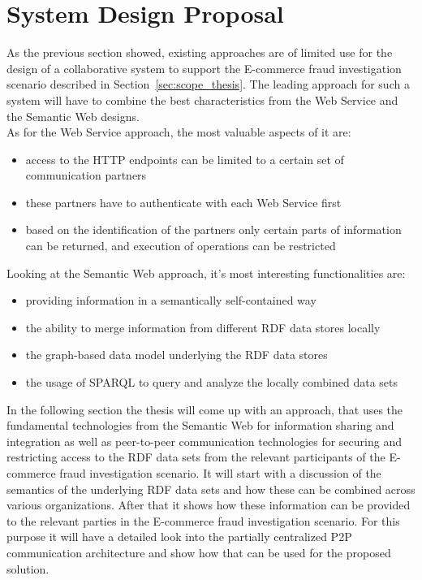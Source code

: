
\section{System Design Proposal}
\label{sec:design_proposal}

As the previous section showed, existing approaches are of limited use for the design of a collaborative system to support the \gls{E-commerce} fraud investigation scenario described in Section~\ref{sec:scope_thesis}. The leading approach for such a system will have to combine the best characteristics from the Web Service and the Semantic Web designs. \\

As for the Web Service approach, the most valuable aspects of it are: \@

\begin{itemize}
	\item access to the \gls{HTTP} endpoints can be limited to a certain set of communication partners
	\item these partners have to authenticate with each Web Service first
	\item based on the identification of the partners only certain parts of information can be returned, and execution of operations can be restricted
\end{itemize}

Looking at the Semantic Web approach, it's most interesting functionalities are: \@

\begin{itemize}
	\item providing information in a semantically self-contained way
	\item the ability to merge information from different \gls{RDF} data stores locally
	\item the graph-based data model underlying the \gls{RDF} data stores
	\item the usage of \gls{SPARQL} to query and analyze the locally combined data sets
\end{itemize}

In the following section the thesis will come up with an approach, that uses the fundamental technologies from the Semantic Web for information sharing and integration as well as peer-to-peer communication technologies for securing and restricting access to the \gls{RDF} data sets from the relevant participants of the \gls{E-commerce} fraud investigation scenario. It will start with a discussion of the semantics of the underlying \gls{RDF} data sets and how these can be combined across various organizations. After that it shows how these information can be provided to the relevant parties in the \gls{E-commerce} fraud investigation scenario. For this purpose it will have a detailed look into the partially centralized \gls{P2P} communication architecture and show how that can be used for the proposed solution.

